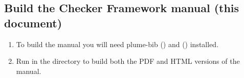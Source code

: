 \subsection{Build the Checker Framework manual (this document)}

\begin{enumerate}
\item
To build the manual you will need plume-bib () and {\hevea} () installed.

\item
Run  in the  directory to build both the PDF and HTML versions of the manual.
\end{enumerate}





% 
% 
% 

